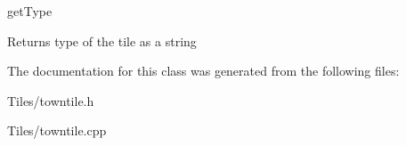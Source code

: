 get\-Type 

\begin{DoxyReturn}{Returns}
type of the tile as a string 
\end{DoxyReturn}


The documentation for this class was generated from the following files\-:\begin{DoxyCompactItemize}
\item 
Tiles/towntile.\-h\item 
Tiles/towntile.\-cpp\end{DoxyCompactItemize}

